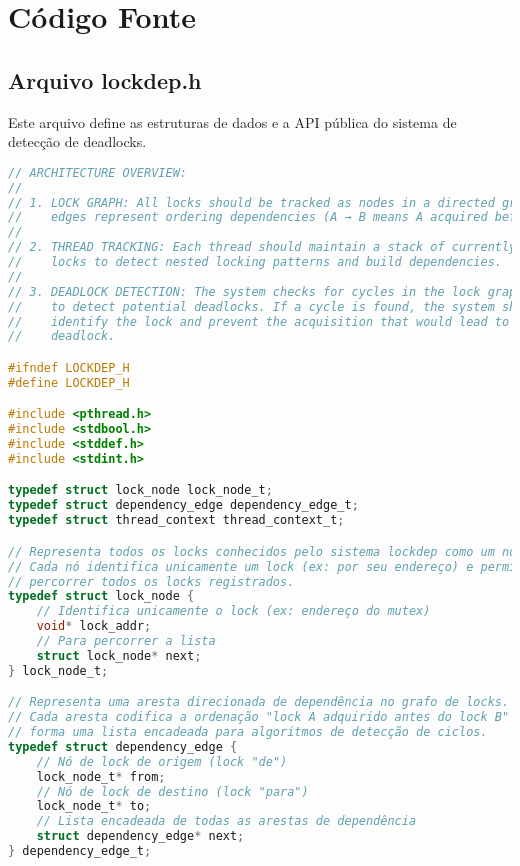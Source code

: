 \chapter{Código Fonte}\label{chap:appendixA}

\section{Arquivo lockdep.h}

Este arquivo define as estruturas de dados e a API pública do sistema de detecção de deadlocks.

\begin{lstlisting}[language=C, caption={lockdep.h - API de detecção de deadlocks}]
// ARCHITECTURE OVERVIEW:
//
// 1. LOCK GRAPH: All locks should be tracked as nodes in a directed graph where
//    edges represent ordering dependencies (A → B means A acquired before B).
//
// 2. THREAD TRACKING: Each thread should maintain a stack of currently held
//    locks to detect nested locking patterns and build dependencies.
//
// 3. DEADLOCK DETECTION: The system checks for cycles in the lock graph
//    to detect potential deadlocks. If a cycle is found, the system should
//    identify the lock and prevent the acquisition that would lead to a
//    deadlock.

#ifndef LOCKDEP_H
#define LOCKDEP_H

#include <pthread.h>
#include <stdbool.h>
#include <stddef.h>
#include <stdint.h>

typedef struct lock_node lock_node_t;
typedef struct dependency_edge dependency_edge_t;
typedef struct thread_context thread_context_t;

// Representa todos os locks conhecidos pelo sistema lockdep como um nó de lista encadeada.
// Cada nó identifica unicamente um lock (ex: por seu endereço) e permite
// percorrer todos os locks registrados.
typedef struct lock_node {
    // Identifica unicamente o lock (ex: endereço do mutex)
    void* lock_addr;
    // Para percorrer a lista
    struct lock_node* next;
} lock_node_t;

// Representa uma aresta direcionada de dependência no grafo de locks.
// Cada aresta codifica a ordenação "lock A adquirido antes do lock B" e
// forma uma lista encadeada para algoritmos de detecção de ciclos.
typedef struct dependency_edge {
    // Nó de lock de origem (lock "de")
    lock_node_t* from;
    // Nó de lock de destino (lock "para")
    lock_node_t* to;
    // Lista encadeada de todas as arestas de dependência
    struct dependency_edge* next;
} dependency_edge_t;


\end{lstlisting}

